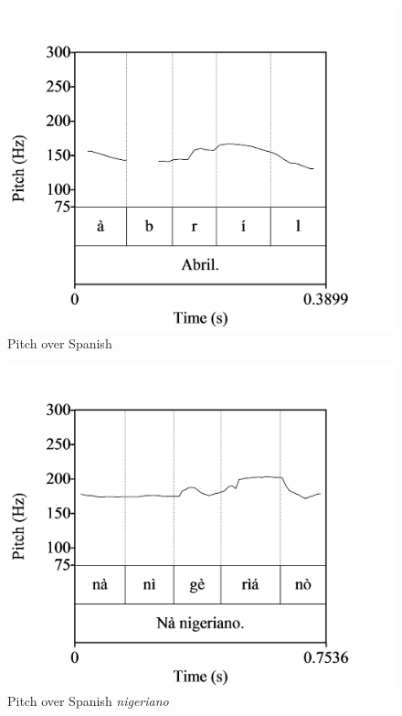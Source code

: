 \begin{figure}
\caption{Pitch over Spanish }
\label{fig:key:3.9}
\includegraphics[height=.3\textheight]{figures/yakpomod-img11.png}
\end{figure}

\begin{figure}
\caption{Pitch over Spanish \textit{nigeriano}}
\label{fig:key:3.10} 
\includegraphics[height=.3\textheight]{figures/yakpomod-img12.png}
\end{figure}

